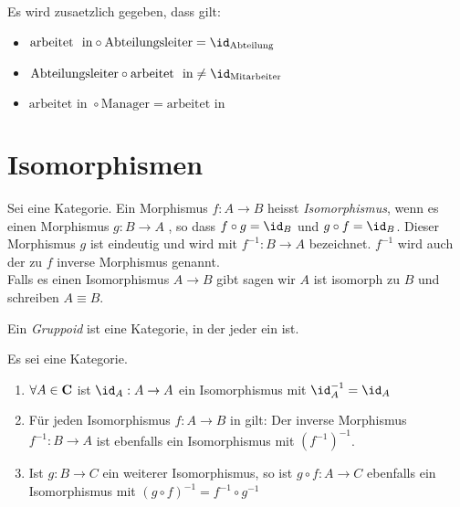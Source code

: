 \documentclass{article}
\begin{document}
	 \begin{bsp}[Datenbanken]
		  \cite[Beispiel 2.2.33]{Bra} \\
		  \\
		 
		 Es wird zusaetzlich gegeben, dass gilt:
		 \begin{itemize}
			 \item \( \text{arbeitet \ in} \circ \text{Abteilungsleiter}= \id_\text{Abteilung}  \)
			 \item \( \text{Abteilungsleiter} \circ \text{arbeitet \ in} \neq \id_\text{Mitarbeiter}  \)
			 \item \( \text{arbeitet \ in }  \circ \text{Manager} = \text{arbeitet \ in } \)
		 \end{itemize}
	 \end{bsp}
	\newpage
	\section{Isomorphismen}
		
		\begin{defi}[Isomorphismus ]
		 \cite[Definition 2.3.1]{Bra}
		Sei \CatC eine Kategorie. Ein Morphismus \( f: A \to B  \) heisst  \emph{Isomorphismus}, wenn es einen Morphismus \( g: B \to A \) , so dass \( f \circ g  = \id_B \) und \( g \circ f = \id_B \). 
		Dieser Morphismus \( g \) ist eindeutig und wird mit \( f^{-1} :B \to A \) bezeichnet.
		\(f^{-1} \) wird auch der zu \( f \)  inverse Morphismus genannt.\\
		
		Falls es einen Isomorphismus \( A \to B \) gibt sagen wir \( A \) ist isomorph zu \( B \) und schreiben \( A \equiv B \).
		\end{defi}
		
		
		 \begin{defi}[Gruppoid]
		  \cite[Beispiel 2.2.34]{Bra}
		 Ein \emph{Gruppoid} ist eine Kategorie, in der jeder \Mor ein \Iso ist.
		  \end{defi}
		  
		  \begin{lem}
		   \cite[Lemma 2.3.9]{Bra}
		  Es sei \CatC eine Kategorie.
		  \begin{enumerate}
			  \item \( \forall A \in \mathbf{C} \) ist \( \id_A :A \to A  \) ein Isomorphismus mit \( \id_A^{-1}=\id_A \)
			  \item F\"ur jeden Isomorphismus \( f: A \to B \) in \CatC gilt: Der inverse Morphismus \(f^{-1}: B \to A \) ist ebenfalls ein Isomorphismus mit \( \left( f^{-1} \right)^{-1} \).
			  \item Ist \(g: B \to C \) ein weiterer Isomorphismus, so ist \( g \circ f :A \to C \) ebenfalls ein Isomorphismus mit \( \left( g \circ f \right)^{-1} =f^{-1} \circ g^{-1} \)  
		  \end{enumerate}
		  	\end{lem}
		  	
\end{document}
